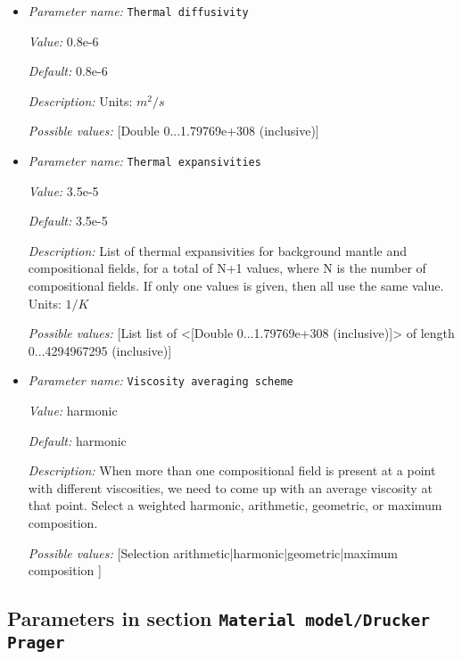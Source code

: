 \begin{itemize}
{\it Possible values:} [List list of <[Double 0...1.79769e+308 (inclusive)]> of length 0...4294967295 (inclusive)]
\item {\it Parameter name:} {\tt Thermal diffusivity}
\label{parameters:Material model/Diffusion dislocation/Thermal diffusivity}


{\it Value:} 0.8e-6


{\it Default:} 0.8e-6


{\it Description:} Units: $m^2/s$


{\it Possible values:} [Double 0...1.79769e+308 (inclusive)]
\item {\it Parameter name:} {\tt Thermal expansivities}
\label{parameters:Material model/Diffusion dislocation/Thermal expansivities}


{\it Value:} 3.5e-5


{\it Default:} 3.5e-5


{\it Description:} List of thermal expansivities for background mantle and compositional fields, for a total of N+1 values, where N is the number of compositional fields. If only one values is given, then all use the same value.  Units: $1 / K$


{\it Possible values:} [List list of <[Double 0...1.79769e+308 (inclusive)]> of length 0...4294967295 (inclusive)]
\item {\it Parameter name:} {\tt Viscosity averaging scheme}
\label{parameters:Material model/Diffusion dislocation/Viscosity averaging scheme}


{\it Value:} harmonic


{\it Default:} harmonic


{\it Description:} When more than one compositional field is present at a point with different viscosities, we need to come up with an average viscosity at that point.  Select a weighted harmonic, arithmetic, geometric, or maximum composition.


{\it Possible values:} [Selection arithmetic|harmonic|geometric|maximum composition ]
\end{itemize}

\subsection{Parameters in section \tt Material model/Drucker Prager}
\label{parameters:Material_20model/Drucker_20Prager}

